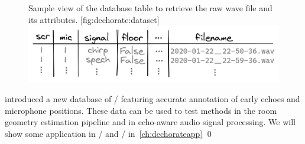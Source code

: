 \begin{figure}
    \begin{sidecaption}[]{
            Sample view of the database table to retrieve the raw wave file and its attributes.
        }[fig:dechorate:dataset]
        \centering
        \includegraphics[width=\linewidth]{figures/dechorate/database.png}
    \end{sidecaption}
\end{figure}

 introduced a new database of \RIRdef/ featuring accurate annotation of early echoes and microphone positions.
These data can be used to test methods in the room geometry estimation pipeline and in echo-aware audio signal processing.
We will show some application in \SE/ and \RooGE/ in~\cref{ch:dechorateapp}
\qed